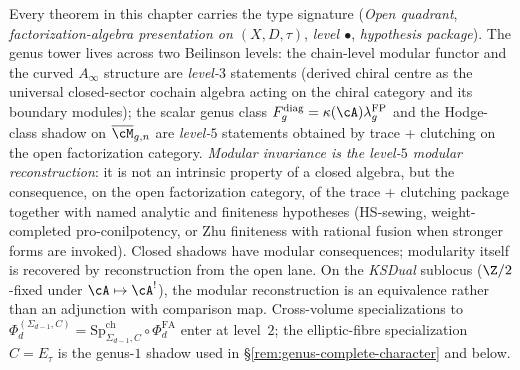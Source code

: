 
\begin{remark}
\label{rem:gc-type-signature}
Every theorem in this chapter carries the type signature
(\emph{Open quadrant}, \emph{factorization-algebra presentation on
$(X,D,\tau)$}, \emph{level $\bullet$}, \emph{hypothesis package}). The
genus tower lives across two Beilinson levels: the chain-level
modular functor and the curved $A_\infty$ structure are
\emph{level-$3$} statements (derived chiral centre as the
universal closed-sector cochain algebra acting on the chiral category
and its boundary modules); the scalar
genus class $F_g^{\mathrm{diag}}=\kappa(\cA)\lambda_g^{\mathrm{FP}}$
and the Hodge-class shadow on $\overline{\cM}_{g,n}$ are
\emph{level-$5$} statements obtained by trace + clutching on the
open factorization category. \emph{Modular invariance is the level-$5$
modular reconstruction}: it is not an intrinsic property of a closed
algebra, but the consequence, on the open factorization category, of
the trace + clutching package together with named analytic and
finiteness hypotheses (HS-sewing, weight-completed pro-conilpotency,
or Zhu finiteness with rational fusion when stronger forms are
invoked). Closed shadows have modular consequences; modularity itself
is recovered by reconstruction from the open lane. On the
\emph{KSDual} sublocus ($\Z/2$-fixed under $\cA\mapsto\cA^!$), the
modular reconstruction is an equivalence rather than an adjunction
with comparison map. Cross-volume specializations to
$\Phi_d^{(\Sigma_{d-1},C)}=\mathrm{Sp}^{\mathrm{ch}}_{\Sigma_{d-1},C}\circ
\Phi_d^{\mathrm{FA}}$ enter at level~$2$; the elliptic-fibre
specialization $C=E_\tau$ is the genus-$1$ shadow used in
\S\ref{rem:genus-complete-character} and below.
\end{remark}

